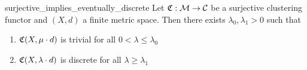 
\begin{lemma}{}{surjective_implies_eventually_discrete}
    Let $\mathfrak{C}: \mathcal{M} \to \mathcal{C}$ be a surjective clustering functor and $(X,d)$ a finite metric space. Then there exists $\lambda_0,\lambda_1 > 0$ such that
    \begin{enumerate}
        \item $\mathfrak{C}(X,\mu \cdot d)$ is trivial for all $0 < \lambda \le \lambda_0$
        \item $\mathfrak{C}(X,\lambda \cdot d)$ is discrete for all $\lambda \ge \lambda_1$
    \end{enumerate}

\end{lemma}

